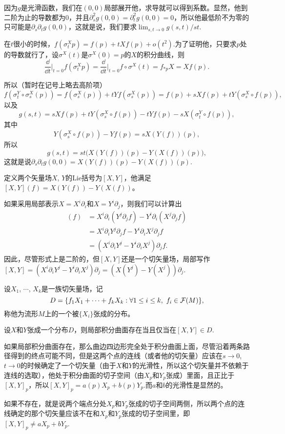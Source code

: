 因为$g$是光滑函数，我们在$(0,0)$局部展开他，求导就可以得到系数。显然，他到二阶为止的导数都为$0$，并且$\partial_s^2g(0,0)=\partial_t^2g(0,0)=0$，所以他最低阶不为零的只可能是$\partial_s\partial_t g(0,0)$，这就是说，我们要求$\lim_{s,t\to 0}g(s,t)/st$.

\para 在$t$很小的时候，$f(\sigma_t^X p)=f(p)+tXf(p)+o(t^2)$.为了证明他，只要求$p$处的导数就行了，设$\sigma^X(t)$是$\sigma^X(0)=p$的$X$的积分曲线，则
	\[
		\frac{\dd}{\dd t}\biggr|_{t=0}f(\sigma_t^X p)=\frac{\dd}{\dd t}\biggr|_{t=0}f\circ \sigma^X (t)=f_{* p}X=Xf(p).
	\]

所以（暂时在记号上略去高阶项）
\[
	f(\sigma^Y_t\circ\sigma^X_s(p))=f(\sigma^X_s(p))+tYf(\sigma^X_s(p))=f(p)+sXf(p)+tY(\sigma^X_s\circ f(p)),
\]
以及
\[
	g(s,t)=sXf(p)+tY(\sigma^X_s\circ f(p))-tYf(p)-sX(\sigma^Y_t\circ f(p)),
\]
其中
\[
	Y(\sigma^X_s\circ f(p))-Yf(p)=sX(Y(f))(p),
\]
所以
\[
	g(s,t)=st\bigl(X(Y(f))(p)-Y(X(f))(p)\bigr),
\]
这就是说$\partial_s\partial_t g(0,0)=X(Y(f))(p)-Y(X(f))(p)$.

\para 定义两个矢量场$X$, $Y$的Lie括号为$[X,Y]$，他满足$[X,Y](f)=X(Y(f))-Y(X(f))$。

如果采用局部表示$X=X^i\partial_i$和$X=Y^i\partial_j$，则我们可以计算出
	\begin{align*}
	[X,Y](f)&=X^i\partial_i(Y^j\partial_j f)-Y^i\partial_i(X^j\partial_j f)\\
	&=X^i\partial_iY^j\partial_j f-Y^i\partial_i X^j\partial_j f\\
	&=(X^i\partial_iY^j-Y^i\partial_i X^j)\partial_jf.
	\end{align*}
	因此，尽管形式上是二阶的，但$[X,Y]$还是一个切矢量场，局部写作$[X,Y]=(X^i\partial_iY^j-Y^i\partial_i X^j)\partial_j=(X(Y^j)-Y(X^j))\partial_j$.


\para 设$X_1$, $\cdots$, $X_k$是一族切矢量场，记
	\[
		D=\{f_1X_1+\cdots+f_kX_k:\forall 1\leq i \leq k,\,\, f_i\in \mathcal{F}(M)\},
	\]
	称他为流形$M$上的一个被$\{X_i\}$张成的分布。

\para 设$X$和$Y$张成一个分布$D$，则局部积分曲面存在当且仅当在$[X,Y]\in D$.

如果局部积分曲面存在，那么曲边四边形完全处于积分曲面上面，尽管沿着两条路径得到的终点可能不同，但是这两个点的连线（或者他的切矢量）应该在$s\to 0$, $t\to 0$的时候确定了一个切矢量（由于$X$和$Y$的光滑性，所以这个切矢量并不依赖于连线的选取），他处于积分曲面的切子空间（由$X_p$和$Y_p$张成）里面，且正比于$[X,Y]_p$，所以$[X,Y]_p=a(p)X_p+b(p)Y_p$.而$a$和$b$的光滑性是显然的。

如果不存在，就是说两个端点分处$X_p$和$Y_p$张成的切子空间两侧，所以两个点的连线确定的那个切矢量应该不在和$X_p$和$Y_p$张成的切子空间里，即$[X,Y]_p\neq aX_p+bY_p$.


